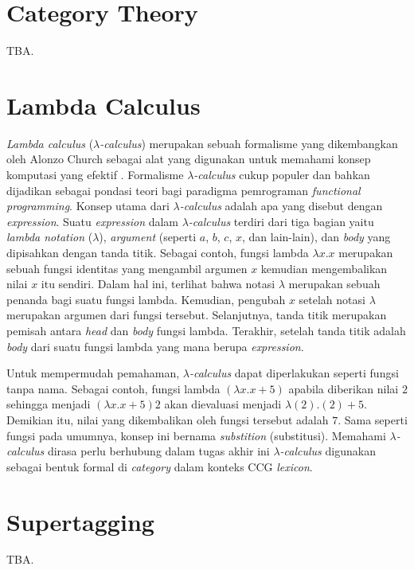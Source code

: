 \section{Category Theory}
TBA.


\section{Lambda Calculus}
\textit{Lambda calculus} ({$\lambda$}\textit{-calculus}) merupakan sebuah formalisme yang dikembangkan
oleh Alonzo Church sebagai alat yang digunakan untuk memahami konsep komputasi yang efektif
\cite{DBLP:journals/corr/Rojas15}.
Formalisme {$\lambda$}\textit{-calculus} cukup populer dan bahkan dijadikan sebagai pondasi teori bagi
paradigma pemrograman \textit{functional programming}.
Konsep utama dari {$\lambda$}\textit{-calculus} adalah apa yang disebut dengan \textit{expression}.
Suatu \textit{expression} dalam {$\lambda$}\textit{-calculus} terdiri dari tiga bagian yaitu
\textit{lambda notation} ({$\lambda$}), \textit{argument} (seperti $a$, $b$, $c$, $x$, dan lain-lain),
dan \textit{body} yang dipisahkan dengan tanda titik.
Sebagai contoh, fungsi lambda ${\lambda}x. x$ merupakan sebuah fungsi identitas yang mengambil
argumen $x$ kemudian mengembalikan nilai $x$ itu sendiri.
Dalam hal ini, terlihat bahwa notasi {$\lambda$} merupakan sebuah penanda bagi suatu fungsi lambda.
Kemudian, pengubah $x$ setelah notasi {$\lambda$} merupakan argumen dari fungsi tersebut.
Selanjutnya, tanda titik merupakan pemisah antara \textit{head} dan \textit{body} fungsi lambda.
Terakhir, setelah tanda titik adalah \textit{body} dari suatu fungsi lambda yang mana berupa
\textit{expression}.

Untuk mempermudah pemahaman, {$\lambda$}\textit{-calculus} dapat diperlakukan seperti fungsi tanpa
nama. Sebagai contoh, fungsi lambda $({\lambda}x. x + 5)$ apabila diberikan nilai $2$ sehingga
menjadi $({\lambda}x. x + 5) 2$ akan dievaluasi menjadi ${\lambda}(2). (2) + 5$.
Demikian itu, nilai yang dikembalikan oleh fungsi tersebut adalah $7$.
Sama seperti fungsi pada umumnya, konsep ini bernama \textit{substition} (substitusi).
Memahami {$\lambda$}\textit{-calculus} dirasa perlu berhubung dalam tugas akhir ini
{$\lambda$}\textit{-calculus} digunakan sebagai bentuk formal di \textit{category}
dalam konteks CCG \textit{lexicon}.


\section{Supertagging}
TBA.


